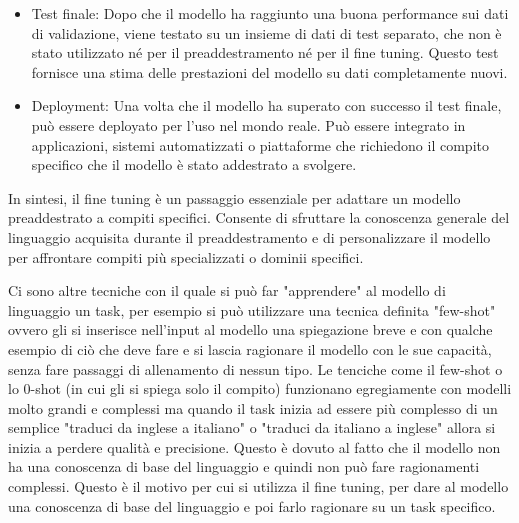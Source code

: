 \begin{itemize}
    \item Test finale: Dopo che il modello ha raggiunto una buona performance sui dati di validazione, viene testato su un insieme di dati di test separato, che non è stato utilizzato né per il preaddestramento né per il fine tuning. Questo test fornisce una stima delle prestazioni del modello su dati completamente nuovi.
    \item Deployment: Una volta che il modello ha superato con successo il test finale, può essere deployato per l'uso nel mondo reale. Può essere integrato in applicazioni, sistemi automatizzati o piattaforme che richiedono il compito specifico che il modello è stato addestrato a svolgere.
    
\end{itemize}
In sintesi, il fine tuning è un passaggio essenziale per adattare un modello preaddestrato a compiti specifici. Consente di sfruttare la conoscenza generale del linguaggio acquisita durante il preaddestramento e di personalizzare il modello per affrontare compiti più specializzati o dominii specifici.

Ci sono altre tecniche con il quale si può far "apprendere" al modello di linguaggio un task, per esempio si può utilizzare una tecnica definita "few-shot" ovvero gli si inserisce nell'input al modello una spiegazione breve e con qualche esempio di ciò che deve fare e si lascia ragionare il modello con le sue capacità, senza fare passaggi di allenamento di nessun tipo. Le tenciche come il few-shot o lo 0-shot (in cui gli si spiega solo il compito) funzionano egregiamente con modelli molto grandi e complessi ma quando il task inizia ad essere più complesso di un semplice "traduci da inglese a italiano" o "traduci da italiano a inglese" allora si inizia a perdere qualità e precisione. Questo è dovuto al fatto che il modello non ha una conoscenza di base del linguaggio e quindi non può fare ragionamenti complessi. Questo è il motivo per cui si utilizza il fine tuning, per dare al modello una conoscenza di base del linguaggio e poi farlo ragionare su un task specifico.